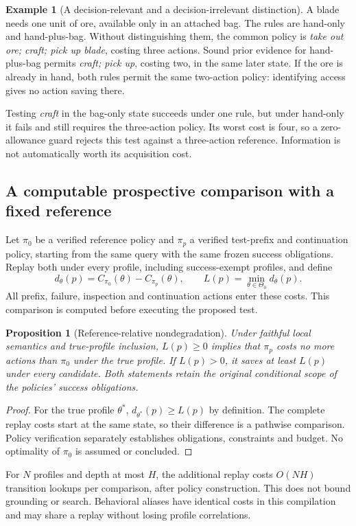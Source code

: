 \documentclass[11pt]{article}
\newtheorem{proposition}[theorem]{Proposition}
\theoremstyle{definition}
\newtheorem{example}[theorem]{Example}
\begin{document}
\begin{example}[A decision-relevant and a decision-irrelevant distinction]
A blade needs one unit of ore, available only in an attached bag. The rules are
hand-only and hand-plus-bag. Without distinguishing them, the common policy is
\emph{take out ore; craft; pick up blade}, costing three actions. Sound prior
evidence for hand-plus-bag permits \emph{craft; pick up}, costing two, in the
same later state. If the ore is already in hand, both rules permit the same
two-action policy: identifying access gives no action saving there.

Testing \emph{craft} in the bag-only state succeeds under one rule, but under
hand-only it fails and still requires the three-action policy. Its worst cost
is four, so a zero-allowance guard rejects this test against a three-action
reference. Information is not automatically worth its acquisition cost.
\end{example}

\subsection{A computable prospective comparison with a fixed reference}
Let $\pi_0$ be a verified reference policy and $\pi_p$ a verified test-prefix
and continuation policy, starting from the same query with the same frozen
success obligations. Replay both under every profile, including success-exempt
profiles, and define
\[
 d_\theta(p)=C_{\pi_0}(\theta)-C_{\pi_p}(\theta),\qquad
 L(p)=\min_{\theta\in\Theta_0}d_\theta(p).
\]
All prefix, failure, inspection and continuation actions enter these costs.
This comparison is computed before executing the proposed test.
\begin{proposition}[Reference-relative nondegradation]\label{prop:profilevalue}
Under faithful local semantics and true-profile inclusion, $L(p)\geq0$ implies
that $\pi_p$ costs no more actions than $\pi_0$ under the true profile.
If $L(p)>0$, it saves at least $L(p)$ under every candidate. Both statements
retain the original conditional scope of the policies' success obligations.
\end{proposition}
\begin{proof}
For the true profile $\theta^*$, $d_{\theta^*}(p)\geq L(p)$ by definition.
The complete replay costs start at the same state, so their difference is a
pathwise comparison. Policy verification separately establishes obligations,
constraints and budget. No optimality of $\pi_0$ is assumed or concluded.
\end{proof}
For $N$ profiles and depth at most $H$, the additional replay costs $O(NH)$
transition lookups per comparison, after policy construction. This does not
bound grounding or search. Behavioral aliases have identical costs in this
compilation and may share a replay without losing profile correlations.
\end{document}
